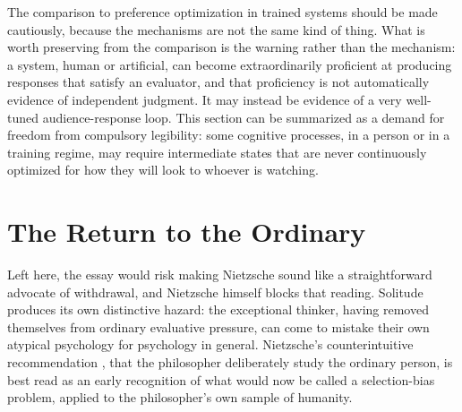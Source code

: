 \documentclass[11pt]{article}
\begin{document}
The comparison to preference optimization in trained systems should be made cautiously, because the mechanisms are not the same kind of thing. What is worth preserving from the comparison is the warning rather than the mechanism: a system, human or artificial, can become extraordinarily proficient at producing responses that satisfy an evaluator, and that proficiency is not automatically evidence of independent judgment. It may instead be evidence of a very well-tuned audience-response loop. This section can be summarized as a demand for freedom from compulsory legibility: some cognitive processes, in a person or in a training regime, may require intermediate states that are never continuously optimized for how they will look to whoever is watching.

\section{The Return to the Ordinary}

Left here, the essay would risk making Nietzsche sound like a straightforward advocate of withdrawal, and Nietzsche himself blocks that reading. Solitude produces its own distinctive hazard: the exceptional thinker, having removed themselves from ordinary evaluative pressure, can come to mistake their own atypical psychology for psychology in general. Nietzsche's counterintuitive recommendation \cite[\S 26]{nietzsche1886}, that the philosopher deliberately study the ordinary person, is best read as an early recognition of what would now be called a selection-bias problem, applied to the philosopher's own sample of humanity.
\end{document}
